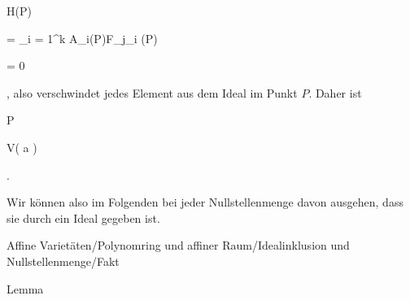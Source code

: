 {{\vergleichskette


{ H(P)
}


{ =} { \sum_{i = 1}^k A_i(P)F_{j_i }(P)
}


{ =} { 0
}


{ } {
}


{ } {
}


}
{}{}{,}
also verschwindet jedes Element aus dem Ideal im Punkt $P$. Daher ist


\mavergleichskette


{\vergleichskette


{ P
}


{ \in }{ V( {\mathfrak a} )
}


{  }{
}


{    }{
}


{   }{
}


}
{}{}{.}


}


Wir können also im Folgenden bei jeder Nullstellenmenge davon ausgehen, dass sie durch ein Ideal gegeben ist.




{Affine Varietäten/Polynomring und affiner Raum/Idealinklusion und Nullstellenmenge/Fakt}


{Lemma}


{}


{






\faktzusatz {}


\faktzusatz {}


}


